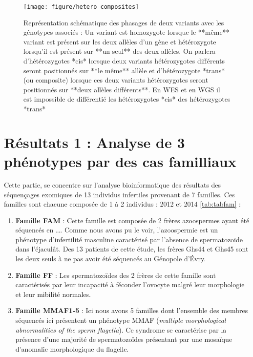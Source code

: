 \documentclass[12pt,twoside]{reedthesis}
\providecommand{\tightlist}{%
  \setlength{\itemsep}{0pt}\setlength{\parskip}{0pt}}
\theoremstyle{definition}
\theoremstyle{definition}
\theoremstyle{remark}
\begin{document}
  \begin{figure}
  
  {\centering \texttt{[image: figure/hetero\_composites]} 
  
  }
  
  \caption[Représentation schématique des phasages de deux variants avec les génotypes associés]{Représentation schématique des phasages de deux variants avec les génotypes associés : Un variant est homozygote lorsque le **même** variant est présent sur les deux allèles d'un gène et hétérozygote lorsqu'il est présent sur **un seul** des deux allèles. On parlera d'hétérozygotes *cis* lorsque deux variants hétérozygotes différents seront positionnés sur **le même** allèle et d'hétérozygote *trans* (ou composite) lorsque ces deux variants hétérozygotes seront positionnés sur **deux allèles différents**. En WES et en WGS il est impossible de différentié les hétérozygotes *cis* des hétérozygotes *trans*}\label{fig:piccompositehet}
  \end{figure}
  
  \newpage
  
  \section{Résultats 1 : Analyse de 3 phénotypes par des cas
  familliaux}\label{resultats-1-analyse-de-3-phenotypes-par-des-cas-familliaux}
  
  Cette partie, se concentre sur l'analyse bioinformatique des résultats
  des séquençages exomiques de 13 individus infertiles provenant de 7
  familles. Ces familles sont chacune composée de 1 à 2 individus : 2012
  et 2014 \ref{tab:tabfam} :
  
  \begin{enumerate}
  \def\labelenumi{\arabic{enumi}.}
  \tightlist
  \item
    \textbf{Famille FAM} : Cette famille est composée de 2 frères
    azoospermes ayant été séquencés en \ldots{}. Comme nous avons pu le
    voir, l'azoospermie est un phénotype d'infertilité masculine
    caractérisé par l'absence de spermatozoïde dans l'éjaculât. Des 13
    patients de cette étude, les frères Ghs44 et Ghs45 sont les deux seuls
    à ne pas avoir été séquencés au Génopole d'Évry.\\
  \item
    \textbf{Famille FF} : Les spermatozoïdes des 2 frères de cette famille
    sont caractérisés par leur incapacité à féconder l'ovocyte malgré leur
    morphologie et leur mibilité normales.\\
  \item
    \textbf{Famille MMAF1-5} : Ici nous avons 5 familles dont l'ensemble
    des membres séquencés ici présentent un phénotype MMAF (\emph{multiple
    morphological abnormalities of the sperm flagella}). Ce syndrome se
    caractérise par la présence d'une majorité de spermatozoïdes
    présentant par une mosaïque d'anomalie morphologique du flagelle.
  \end{enumerate}
  
\end{document}
